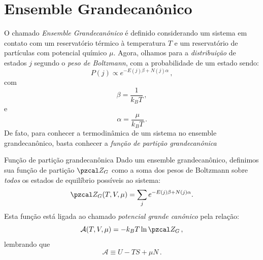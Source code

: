 \chapter{Ensemble Grandecanônico}

    O chamado \textit{Ensemble Grandecanônico} é definido considerando um sistema em contato com um reservatório térmico à temperatura $T$ e um reservatório de partículas com potencial químico $\mu$. Agora, olhamos para a \textit{distribuição} de estados $j$ segundo o \textit{peso de Boltzmann}, com a probabilidade de um estado sendo:
    \begin{equation}
        P(j) \propto e^{-E(j)\beta+N(j)\alpha}\,,
    \end{equation}
    com \[\beta=\frac{1}{k_BT}\,,\] e \[\alpha=\frac{\mu}{k_BT}\,.\] De fato, para conhecer a termodinâmica de um sistema no ensemble grandecanônico, basta conhecer a \textit{função de partição grandecanônica}

    \begin{statementbox}{Função de partição grandecanônica}
        Dado um ensemble grandecanônico, definimos sua função de partição $\zg$ como a soma dos pesos de Boltzmann sobre \textit{todos} os estados de equilíbrio possíveis ao sistema:
        \begin{equation}
            \zg(T,V,\mu) = \sum_{j}e^{-E(j)\beta+N(j)\alpha}.
        \end{equation}
        Esta função está ligada ao chamado \textit{potencial grande canônico} pela relação:
        \begin{equation}
            \mathcal{A}(T,V,\mu)=-k_BT\ln\zg\,,
        \end{equation}
        lembrando que
        \begin{equation}
            \mathcal{A}\equiv U - TS + \mu N\,.
        \end{equation}
    \end{statementbox}